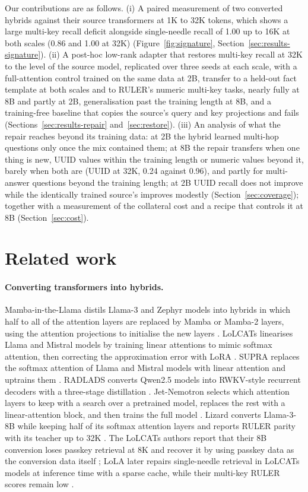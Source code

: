 \documentclass[11pt]{article}
\begin{document}
Our contributions are as follows. (i) A paired measurement of two converted hybrids against their source transformers at 1K to 32K tokens, which shows a large multi-key recall deficit alongside single-needle recall of 1.00 up to 16K at both scales (0.86 and 1.00 at 32K) (Figure~\ref{fig:signature}, Section~\ref{sec:results-signature}). (ii) A post-hoc low-rank adapter that restores multi-key recall at 32K to the level of the source model, replicated over three seeds at each scale, with a full-attention control trained on the same data at 2B, transfer to a held-out fact template at both scales and to RULER's numeric multi-key tasks, nearly fully at 8B and partly at 2B, generalisation past the training length at 8B, and a training-free baseline that copies the source's query and key projections and fails (Sections~\ref{sec:results-repair} and~\ref{sec:restore}). (iii) An analysis of what the repair reaches beyond its training data: at 2B the hybrid learned multi-hop questions only once the mix contained them; at 8B the repair transfers when one thing is new, UUID values within the training length or numeric values beyond it, barely when both are (UUID at 32K, 0.24 against 0.96), and partly for multi-answer questions beyond the training length; at 2B UUID recall does not improve while the identically trained source's improves modestly (Section~\ref{sec:coverage}); together with a measurement of the collateral cost and a recipe that controls it at 8B (Section~\ref{sec:cost}).

\section{Related work}
\paragraph{Converting transformers into hybrids.} Mamba-in-the-Llama distils Llama-3 and Zephyr models into hybrids in which half to all of the attention layers are replaced by Mamba or Mamba-2 layers, using the attention projections to initialise the new layers \citep{mambainllama2024,mamba2_2024}. LoLCATs linearises Llama and Mistral models by training linear attentions to mimic softmax attention, then correcting the approximation error with LoRA \citep{lolcats2024}. SUPRA replaces the softmax attention of Llama and Mistral models with linear attention and uptrains them \citep{supra2024}. RADLADS converts Qwen2.5 models into RWKV-style recurrent decoders with a three-stage distillation \citep{radlads2025}. Jet-Nemotron selects which attention layers to keep with a search over a pretrained model, replaces the rest with a linear-attention block, and then trains the full model \citep{jetnemotron2025}. Lizard converts Llama-3-8B while keeping half of its softmax attention layers and reports RULER parity with its teacher up to 32K \citep{lizard2025}. The LoLCATs authors report that their 8B conversion loses passkey retrieval at 8K and recover it by using passkey data as the conversion data itself \citep[App.~B.5.2]{lolcats2024}; LoLA later repairs single-needle retrieval in LoLCATs models at inference time with a sparse cache, while their multi-key RULER scores remain low \citep{lola2025}.
\end{document}
